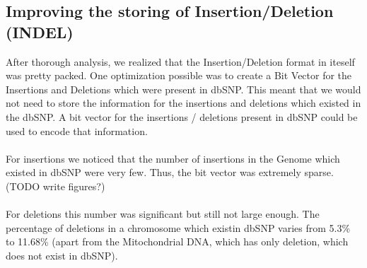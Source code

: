 \documentclass{article}
\begin{document}
\subsection {Improving the storing of Insertion/Deletion (INDEL)}
After thorough analysis, we realized that the Insertion/Deletion format in iteself was pretty packed. One optimization possible was to create a Bit Vector for the Insertions and Deletions which were present in dbSNP. This meant that we would not need to store the information for the insertions and deletions which existed in the dbSNP. A bit vector for the insertions / deletions present in dbSNP could be used to encode that information.\\ 
\\
For insertions we noticed that the number of insertions in the Genome which existed in dbSNP were very few. Thus, the bit vector was extremely sparse. (TODO write figures?) \\
\\
For deletions this number was significant but still not large enough. The percentage of deletions in a chromosome which existin dbSNP varies from 5.3\% to 11.68\% (apart from the Mitochondrial DNA, which has only deletion, which does not exist in dbSNP).
\end{document}
